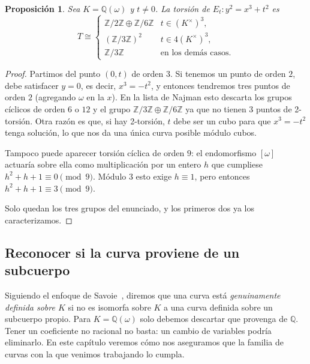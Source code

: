 \documentclass[a4paper]{book}
\theoremstyle{definition}
\theoremstyle{plain}
\newtheorem{prop}[definition]{Proposición}
\newcommand{\QQ}{\mathbb{Q}}
\newcommand{\ZZ}{\mathbb{Z}}
\begin{document}
\begin{prop}\label{prop:torsionEt}
Sea $K=\QQ(\omega)$ y $t\neq0$. La torsión de $E_t:y^2=x^3+t^2$ es
\[
T\cong
\begin{cases}
\ZZ/2\ZZ\oplus\ZZ/6\ZZ & t \in {(K^\times)}^3,\\
{(\ZZ/3\ZZ)}^2 & t \in 4{(K^\times)}^3,\\
\ZZ/3\ZZ & \text{en los demás casos}.
\end{cases}
\]
\end{prop}
\begin{proof}
Partimos del punto $(0,t)$ de orden $3$. Si tenemos un punto de orden $2$, debe satisfacer $y=0$, es decir, $x^3=-t^2$, y entonces tendremos tres puntos de orden $2$ (agregando $\omega$ en la $x$). En la lista de Najman esto descarta los grupos cíclicos de orden $6$ o $12$ y el grupo $\ZZ/3\ZZ\oplus\ZZ/6\ZZ$ ya que no tienen 3 puntos de 2-torsión. Otra razón es que, si hay 2-torsión, $t$ debe ser un cubo para que $x^3=-t^2$ tenga solución, lo que nos da una única curva posible módulo cubos.

Tampoco puede aparecer torsión cíclica de orden $9$: el endomorfismo $[\omega]$ actuaría sobre ella como multiplicación por un entero $h$ que cumpliese $h^2+h+1\equiv0 \pmod{9}$. Módulo $3$ esto exige $h\equiv1$, pero entonces $h^2+h+1\equiv3\pmod9$.

Solo quedan los tres grupos del enunciado, y los primeros dos ya los caracterizamos.
\end{proof}

\subsection{Reconocer si la curva proviene de un subcuerpo}\label{subsec:definicionGenuina}

Siguiendo el enfoque de Savoie~\cite{Savoie2025QiRank2}, diremos que una curva está \emph{genuinamente definida sobre $K$} si no es isomorfa sobre $K$ a una curva definida sobre un subcuerpo propio. Para $K=\QQ(\omega)$ solo debemos descartar que provenga de $\QQ$. Tener un coeficiente no racional no basta: un cambio de variables podría eliminarlo. En este capítulo veremos cómo nos aseguramos que la familia de curvas con la que venimos trabajando lo cumpla. 
\end{document}
